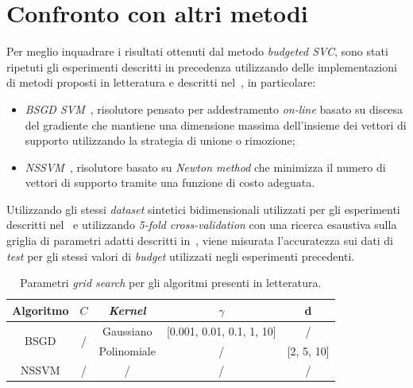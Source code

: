 \section{Confronto con altri metodi}\label{sec:comparazione_metodi}
Per meglio inquadrare i risultati ottenuti dal metodo \emph{budgeted SVC}, sono stati ripetuti gli esperimenti descritti in precedenza utilizzando delle implementazioni di metodi proposti in letteratura e descritti nel~, in particolare:
\begin{itemize}
    \item \emph{BSGD SVM}~\cite{2012_bsgd}, risolutore pensato per addestramento \emph{on-line} basato su discesa del gradiente che mantiene una dimensione massima dell'insieme dei vettori di supporto utilizzando la strategia di unione o rimozione;
    \item \emph{NSSVM}~\cite{2020_sparse_svm}, risolutore basato su \emph{Newton method} che minimizza il numero di vettori di supporto tramite una funzione di costo adeguata.
\end{itemize}
Utilizzando gli stessi \emph{dataset} sintetici bidimensionali utilizzati per gli esperimenti descritti nel~ e utilizzando \emph{5-fold cross-validation} con una ricerca esaustiva sulla griglia di parametri adatti descritti in~, viene misurata l'accuratezza sui dati di \emph{test} per gli stessi valori di \emph{budget} utilizzati negli esperimenti precedenti.
\begin{table}
    \centering
    \begin{tabular}{ccccc}
        \toprule
        Algoritmo & $C$ & \emph{Kernel} & $\gamma$ & d \\
        \midrule
        \multirow{2}{*}{BSGD}   & \multirow{2}{*}{/}  & Gaussiano   & [0.001, 0.01, 0.1, 1, 10]   & /\\
                                      \cline{3-5}
                                &   & Polinomiale & / & [2, 5, 10] \\
        \hline
        NSSVM   & / & / & / & / \\
        \bottomrule
    \end{tabular}
    \caption{Parametri \emph{grid search} per gli algoritmi presenti in letteratura.}
    \label{tab:gridsearch_comparazioni}
\end{table}

